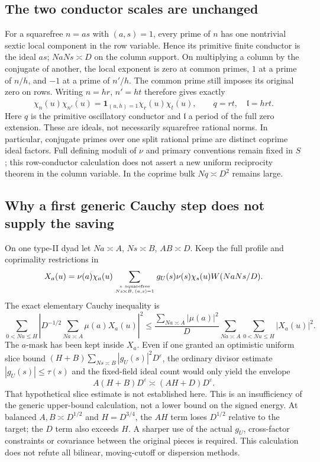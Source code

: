 \subsection{The two conductor scales are unchanged}
For a squarefree $n=as$ with $(a,s)=1$, every prime of $n$ has one
nontrivial sextic local component in the row variable. Hence its primitive
finite conductor is the ideal $as$; $NaNs\asymp D$ on the column support.
On multiplying a column by the conjugate of another, the local exponent
is zero at common primes, $1$ at a prime of $n/h$, and $-1$ at a prime
of $n'/h$. The common prime still imposes its original zero on rows.
Writing $n=h r$, $n'=h t$ therefore gives exactly
\[
 \chi_n(u)\overline{\chi_{n'}(u)}
 =\mathbf1_{(u,h)=1}\chi_r(u)\overline{\chi_t(u)},\qquad
 q=rt,\quad\mathfrak l=hrt.
\]
Here $q$ is the primitive oscillatory conductor and $\mathfrak l$ a
period of the full zero extension. These are ideals, not necessarily
squarefree rational norms. In particular, conjugate primes over one split
rational prime are distinct coprime ideal factors. Full defining moduli
of $\nu$ and primary conventions remain fixed in $S$; this row-conductor
calculation does not assert a new uniform reciprocity theorem in the
column variable. In the coprime bulk $Nq\asymp D^2$ remains large.

\subsection{Why a first generic Cauchy step does not supply the saving}
On one type-II dyad let $Na\asymp A$, $Ns\asymp B$, $AB\asymp D$.
Keep the full profile and coprimality restrictions in
\[
 X_a(u)=\nu(a)\chi_a(u)
  \sum_{s\ {\rm squarefree}\atop Ns\asymp B,\,(a,s)=1}
  g_U(s)\nu(s)\chi_s(u)W(NaNs/D).
\]
The exact elementary Cauchy inequality is
\[
 \sum_{0<Nu\le H}\left|D^{-1/2}\sum_{Na\asymp A}\mu(a)X_a(u)\right|^2
 \le \frac{\sum_{Na\asymp A}|\mu(a)|^2}{D}
       \sum_{Na\asymp A}\sum_{0<Nu\le H}|X_a(u)|^2.
\]
The $a$-mask has been kept inside $X_a$. Even if one granted an optimistic
uniform slice bound $(H+B)\sum_{Ns\asymp B}|g_U(s)|^2D^\varepsilon$,
the ordinary divisor estimate $|g_U(s)|\le\tau(s)$ and the fixed-field
ideal count would only yield the envelope
\[
 A(H+B)D^\varepsilon\asymp(AH+D)D^\varepsilon.
\]
That hypothetical slice estimate is not established here. This is an
insufficiency of the generic upper-bound calculation, not a lower bound
on the signed energy. At balanced $A,B\asymp D^{1/2}$ and $H=D^{3/4}$,
the $AH$ term loses $D^{1/2}$ relative to the target; the $D$ term also
exceeds $H$. A sharper use of the actual $g_U$, cross-factor constraints
or covariance between the original pieces is required. This calculation
does not refute all bilinear, moving-cutoff or dispersion methods.

